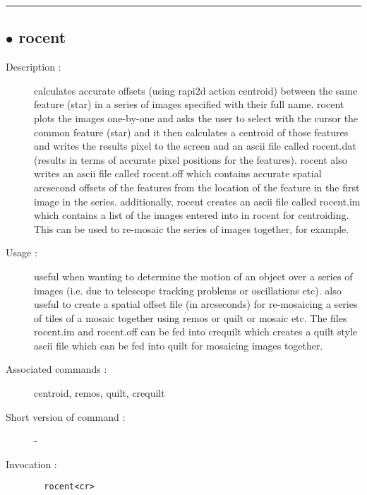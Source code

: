 \hrule \subsection*{$\bullet$ rocent}
\begin{description}
\item[Description :] calculates accurate offsets (using rapi2d action centroid)
between the same feature (star) in a series of images specified with
their full name.  rocent plots the images one-by-one and asks the user to
select with the cursor the common feature (star) and it then calculates a
centroid of those features and writes the results pixel to the screen and
an ascii file called rocent.dat (results in terms of accurate pixel
positions for the features). rocent also writes an ascii file called
rocent.off which contains accurate spatial arcsecond offsets of the
features from the location of the feature in the first image in the
series.  additionally, rocent creates an ascii file called rocent.im
which contains a list of the images entered into in rocent for
centroiding.  This can be used to re-mosaic the series of images
together, for example.
\item[Usage :] useful when wanting to determine the motion of an object over a
series of images (i.e. due to telescope tracking problems or oscillations
etc).  also useful to create a spatial offset file (in arcseconds) for
re-mosaicing a series of tiles of a mosaic together using remos or quilt
or mosaic etc.  The files rocent.im and rocent.off can be fed into
crequilt which creates a quilt style ascii file which can be fed into
quilt for mosaicing images together.
\item[Associated commands :] centroid, remos, quilt, crequilt
\item[Short version of command :] -
\item[Invocation :]

\verb+  rocent<cr> +\end{description}

